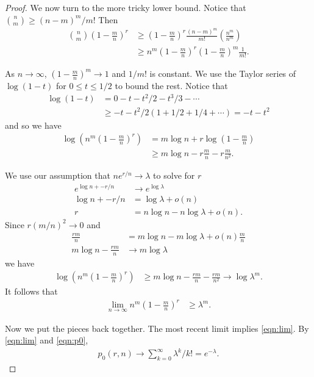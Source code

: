 \documentclass[12pt]{article}
\theoremstyle{definition}
\begin{document}
\begin{proof}
We now turn to the more tricky lower bound.
Notice that ${n \choose m} \geq (n-m)^m / m!$
Then
\begin{align}
{n \choose m} \left(1-\frac{m}{n}\right)^r
&\geq \left(1-\frac{m}{n}\right)^r \frac{(n-m)^m}{m!}
\left( \frac{n^m}{n^m} \right) \nonumber\\
&\geq n^m (1 - \frac{m}{n})^r (1- \frac{m}{n})^m  \frac{1}{m!}. \nonumber
\end{align}

As $n \rightarrow \infty$, $\left(1-\frac{m}{n}\right)^m \rightarrow 1$
and $1/m!$ is constant.
We use the Taylor series of $\log(1-t)$ for $0 \leq t \leq 1/2$
to bound the rest.
Notice that
\begin{align}
\log(1-t) &= 0 - t - t^2/2 -t^3/3 - \cdots \nonumber\\
&\geq -t -t^2/2(1 + 1/2 + 1/4 + \cdots) = -t - t^2 \nonumber
\end{align}
and so we have
\begin{align}
\log \left(n^m\left(1-\frac{m}{n}\right)^r \right)
&= m \log n + r \log\left(1-\frac{m}{n}\right) \nonumber \\
& \geq m \log n - r\frac{m}{n} - r\frac{m}{n^2}. \nonumber
\end{align}

We use our assumption that $ne^{r/n} \rightarrow \lambda$
to solve for $r$
\begin{align}
e^{\log n + -r/n} &\rightarrow e^{\log \lambda} \nonumber\\
\log n + -r/n &= \log \lambda + o(n) \nonumber \\
r &= n \log n - n \log \lambda + o(n). \nonumber
\end{align}
Since $r (m/n)^2 \rightarrow 0$ and
\begin{align}
\frac{rm}{n} &=m \log n - m \log \lambda + o(n)\frac{m}{n} \nonumber \\
 m \log n - \frac{rm}{n}&\rightarrow m \log \lambda \nonumber
\end{align}
we have
\begin{align}
\log \left(n^m\left(1-\frac{m}{n}\right)^r \right)
&\geq m \log n - \frac{rm}{n} - \frac{rm}{n^2} \rightarrow \log \lambda^m. \nonumber
\end{align}
It follows that
\begin{align}
\lim_{n\rightarrow \infty} n^m\left(1-\frac{m}{n}\right)^r
&\geq \lambda^m. \nonumber
\end{align}

Now we put the pieces back together.
The most recent limit implies \cref{eqn:lim}.
By \cref{eqn:lim} and \cref{eqn:p0},
\begin{align}
p_0(r,n) \rightarrow \sum_{k=0}^\infty \lambda^k /k! = e^{-\lambda}. \nonumber
\end{align}


\end{proof}
\end{document}
